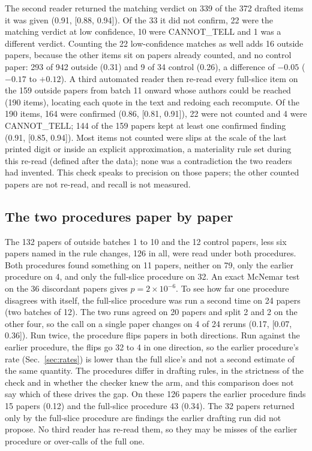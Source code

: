 \documentclass[reprint,amsmath,amssymb,aps,superscriptaddress,nofootinbib]{revtex4-2}
\begin{document}
The second reader returned the matching verdict on 339 of the 372 drafted items it was given (0.91, [0.88, 0.94]). Of the 33 it did not confirm, 22 were the matching verdict at low confidence, 10 were CANNOT\_TELL and 1 was a different verdict. Counting the 22 low-confidence matches as well adds 16 outside papers, because the other items sit on papers already counted, and no control paper: 293 of 942 outside (0.31) and 9 of 34 control (0.26), a difference of $-0.05$ ($-0.17$ to $+0.12$). A third automated reader then re-read every full-slice item on the 159 outside papers from batch 11 onward whose authors could be reached (190 items), locating each quote in the text and redoing each recompute. Of the 190 items, 164 were confirmed (0.86, [0.81, 0.91]), 22 were not counted and 4 were CANNOT\_TELL; 144 of the 159 papers kept at least one confirmed finding (0.91, [0.85, 0.94]). Most items not counted were slips at the scale of the last printed digit or inside an explicit approximation, a materiality rule set during this re-read (defined after the data); none was a contradiction the two readers had invented. This check speaks to precision on those papers; the other counted papers are not re-read, and recall is not measured.

\subsection{The two procedures paper by paper}

The 132 papers of outside batches 1 to 10 and the 12 control papers, less six papers named in the rule changes, 126 in all, were read under both procedures. Both procedures found something on 11 papers, neither on 79, only the earlier procedure on 4, and only the full-slice procedure on 32. An exact McNemar test on the 36 discordant papers gives $p = 2\times10^{-6}$. To see how far one procedure disagrees with itself, the full-slice procedure was run a second time on 24 papers (two batches of 12). The two runs agreed on 20 papers and split 2 and 2 on the other four, so the call on a single paper changes on 4 of 24 reruns (0.17, [0.07, 0.36]). Run twice, the procedure flips papers in both directions. Run against the earlier procedure, the flips go 32 to 4 in one direction, so the earlier procedure's rate (Sec.~\ref{sec:rates}) is lower than the full slice's and not a second estimate of the same quantity. The procedures differ in drafting rules, in the strictness of the check and in whether the checker knew the arm, and this comparison does not say which of these drives the gap. On these 126 papers the earlier procedure finds 15 papers (0.12) and the full-slice procedure 43 (0.34). The 32 papers returned only by the full-slice procedure are findings the earlier drafting run did not propose. No third reader has re-read them, so they may be misses of the earlier procedure or over-calls of the full one.
\end{document}
